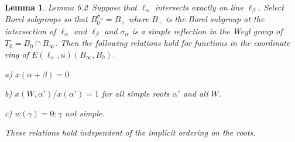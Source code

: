 \documentclass{memo-l}
\newtheorem{lemma}[theorem]{Lemma}
\theoremstyle{definition}
\theoremstyle{remark}
\numberwithin{section}{chapter}
\numberwithin{equation}{chapter}
\begin{document}
\begin{lemma}{Lemma 6.2}\ Suppose that ${\ell}_{{\alpha}}$ intersects
exactly on line ${\ell}_{{\beta}}$.  Select Borel subgroups so that
$B_{0}^{{\sigma}_{{\alpha}}} =  B_{+}$ where $B_{+}$ is the Borel
subgroup at the intersection of ${\ell}_{{\alpha}}$ and ${\ell}_{{\beta}}$
and ${\sigma}_{{\alpha}}$ is a simple reflection in the Weyl group of
$T_{0}  =  B_{0}  \cap  B_{{\infty}}$.  Then the following relations hold for
functions in the coordinate ring of
$E({\ell}_{{\alpha}},u)(B_{{\infty}},B_{0})$.

\noindent
a)  $x({\alpha}+{\beta})  =  0$

\noindent
b) $x(W,{\alpha}')/x({\alpha}')  =  1$ for all simple roots ${\alpha}'$ and
all $W$.

\noindent
c) $w({\gamma})  =  0 : {\gamma}$ not simple.

\noindent
These relations hold independent of the implicit ordering on the roots.
\end{lemma}
\end{document}
